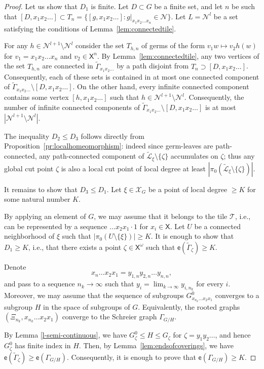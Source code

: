 \documentclass[11pt]{amsart}
\newcommand{\limg}[1][G]{\mathcal{X}_{#1}}
\newcommand{\til}{\mathcal{T}}
\newcommand{\xo}{\alb^\omega}
\newcommand{\leaf}{\mathcal{L}}
\newcommand{\leaftilde}{\widetilde{\leaf}}
\newcommand{\alb}{\ensuremath{\mathsf{X}}}%
\newcommand{\nuke}{\ensuremath{\mathcal{N}}}%
\newcommand{\Gammatilde}{\ensuremath{\widetilde{\Gamma}}}%
\newcommand{\esf}{\ensuremath{\mathsf{e}}}
\theoremstyle{definition}
\theoremstyle{plain}
\newtheorem{main thm}{Theorem}
\theoremstyle{remark}
\theoremstyle{plain}
\begin{document}
\begin{proof}
Let us show that $D_1$ is finite. Let $D\subset G$ be a finite set, and let $n$ be such that $[D, x_1x_2\ldots]\subset T_n=\{[g, x_1x_2\ldots]\colon g|_{x_1x_2\ldots x_n}\in\nuke\}$. Let $L=\nuke^l$ be a set satisfying the conditions of Lemma~\ref{lem:connectedtile}. 

For any $h\in\nuke^{l+1}\setminus\nuke^l$ consider the set $T_{h, n}$ of germs of the form $v_1w\mapsto v_2h(w)$ for $v_1=x_1x_2\ldots x_n$ and $v_2\in\alb^n$. By Lemma~\ref{lem:connectedtile}, any two vertices of the set $T_{h, n}$ are connected in $\Gammatilde_{x_1x_2\ldots}$ by a path disjoint from $T_n\supset [D, x_1x_2\ldots]$. Consequently, each of these sets is contained in at most one connected component of $\Gammatilde_{x_1x_2\ldots}\setminus [D, x_1x_2\ldots]$. On the other hand, every infinite connected component contains some vertex $[h, x_1x_2\ldots]$ such that $h\in\nuke^{l+1}\setminus\nuke^l$. Consequently, the number of infinite connected components of $\Gammatilde_{x_1x_2\ldots}\setminus [D, x_1x_2\ldots]$ is at most $|\nuke^{l+1}\setminus\nuke^l|$.

The inequality $D_2\le D_3$ follows directly from Proposition~\ref{pr:localhomeomorphism}:  indeed since germ-leaves are path-connected, any path-connected component of $ \leaftilde_\xi\setminus \{\zeta\}$ accumulates on $\zeta$; thus any global cut point  $\zeta$ is also a local cut point of local degree at least $|\pi_0(\leaftilde_\xi\setminus \{\zeta\})|$.  

It remains to show that $D_3\le D_1$. Let  $\xi\in\limg$ be a point of local degree $\ge K$ for some natural number $K$. 

By applying an element of $G$, we may assume that it belongs to the tile $\til$, i.e., can be represented by a sequence $\ldots x_2x_1\cdot 1$ for $x_i\in\alb$. Let $U$ be a connected neighborhood of $\xi$ such that $|\pi_0(U\setminus\{\xi\})|\ge K$. It is enough to show that $D_1\ge K$, i.e., that there exists a point $\zeta\in\xo$ such that $\esf(\Gammatilde_\zeta)\ge K$.

Denote
\[x_n\ldots x_2x_1=y_{1, n}y_{2, n}\ldots y_{n, n},\]
and pass to a sequence $n_k\to\infty$ such that $y_i=\lim_{k\to\infty}y_{i, n_k}$ for every $i$. Moreover, we may assume that the sequence of subgroups $G_{x_{n_k}\ldots x_2x_1}^0$ converges to a subgroup $H$ in the space of subgroups of $G$. Equivalently, the rooted graphs $(\Xi_{n_k}, x_{n_k}\ldots x_2x_1)$ converge to the Schreier graph $\Gamma_{G/H}$.

By Lemma \ref{l-semi-continuous}, we have $G^0_{\zeta}\le H\le G_\zeta$ for $\zeta=y_1y_2\ldots$, and hence $G^0_\zeta$ has finite index in $H$. Then, by Lemma~\ref{lem:endsofcoverings}, we have $\esf(\Gammatilde_\zeta)\ge\esf(\Gamma_{G/H})$. Consequently, it is enough to prove that $\esf(\Gamma_{G/H})\ge K$.



\end{proof}
\end{document}
